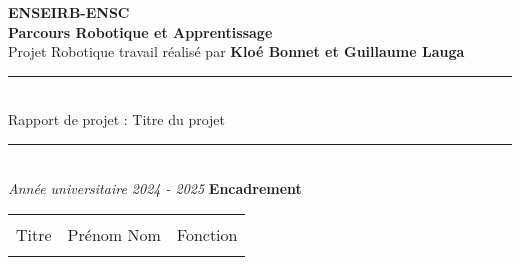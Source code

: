 \thispagestyle{empty}
\addtolength{\hoffset}{-.5cm}
\addtolength{\textheight}{1cm}
\begin{center}
{\large \bf ENSEIRB-ENSC\\}
\vspace{5pt}
{\large \bf Parcours Robotique et Apprentissage\\}
\vfill
{\Huge Projet Robotique}
\vfill
\vspace{15pt}
travail réalisé par
\vfill
{\large \bf Kloé Bonnet et Guillaume Lauga}
\vfill
\rule[2mm]{60mm}{0.2mm}\\
{\huge Rapport de projet : Titre du projet\\}
\rule[-2mm]{60mm}{0.2mm}\\
\vfill
\textit{Année universitaire 2024 - 2025}
\vfill
\vspace{30pt}
{\bf Encadrement}
\vspace{10pt}
{\small
\begin{tabular}{p{}p{}p{}}
 & & \\
Titre &  Prénom {\sc Nom}  & Fonction\\
 & & \\
\end{tabular}
}
\end{center}
